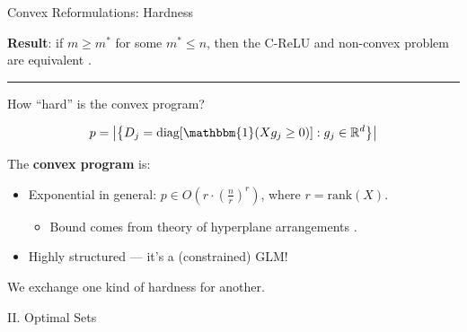 \documentclass[usenames,dvipsnames,mathserif,notheorems]{beamer}
\newcommand{\horizontalrule}{
	{
			\vspace{-0.5em}
			\center \rule{\textwidth}{0.1em}
			\vspace{-0.2em}
		}
}
\newcommand{\bad}[1]{\textcolor{bad}{#1}}
\newcommand{\good}[1]{\textcolor{good}{#1}}
\begin{document}
\begin{frame}{Convex Reformulations: Hardness}

	\textbf{Result}: if \( m \geq m^* \) for some \( m^* \leq n \),
	then the C-ReLU and non-convex problem are \good{equivalent}
	\citep{pilanci2020convex}.

	\pause
	\horizontalrule

	How ``hard'' is the convex program?
	\pause

	\[
		p = \abs{\cbr{D_j = \text{diag}[\mathbbm{1}(X g_j \geq 0)] : g_j \in \R^d }}
	\]

	\vspace{2em}
	\pause

	The \textbf{convex program} is:
	\vspace{0.5em}
	\begin{itemize}
		\item \bad{Exponential in general}: \( p \in O(r \cdot (\frac{n}{r})^r) \),
		      where \( r = \text{rank}(X) \).
		      \vspace{0.25em}
		      \begin{itemize}
			      \item Bound comes from theory of hyperplane arrangements \citep{winder1966partitions}.
		      \end{itemize}
		      \pause

		      \vspace{0.5em}

		\item Highly \good{structured} --- it's a (constrained) GLM!
	\end{itemize}

	\vspace{1em}
	\pause

	\begin{center}
		\Large
		We exchange one kind of hardness for another.
	\end{center}

\end{frame}

\begin{frame}{}
	\begin{center}
		\huge II. Optimal Sets
	\end{center}
\end{frame}
\end{document}
